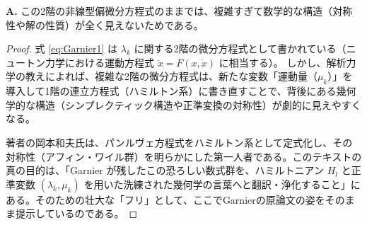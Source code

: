 \begin{Q}
\textbf{A.} この2階の非線型偏微分方程式のままでは、複雑すぎて数学的な構造（対称性や解の性質）が全く見えないためである。

\begin{proof}
式 \eqref{eq:Garnier1} は $\lambda_k$ に関する2階の微分方程式として書かれている（ニュートン力学における運動方程式 $\ddot{x} = F(x, \dot{x})$ に相当する）。
しかし、解析力学の教えによれば、複雑な2階の微分方程式は、新たな変数「運動量（$\mu_k$）」を導入して1階の連立方程式（ハミルトン系）に書き直すことで、背後にある幾何学的な構造（シンプレクティック構造や正準変換の対称性）が劇的に見えやすくなる。

著者の岡本和夫氏は、パンルヴェ方程式をハミルトン系として定式化し、その対称性（アフィン・ワイル群）を明らかにした第一人者である。このテキストの真の目的は、「Garnier が残したこの恐ろしい数式群を、ハミルトニアン $H_l$ と正準変数 $(\lambda_k, \mu_k)$ を用いた洗練された幾何学の言葉へと翻訳・浄化すること」にある。そのための壮大な「フリ」として、ここでGarnierの原論文の姿をそのまま提示しているのである。
\end{proof}
\end{Q}

